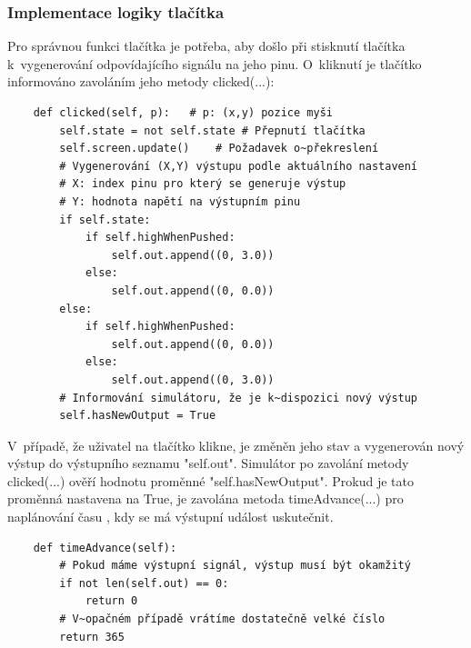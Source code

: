 \subsubsection{Implementace logiky tlačítka}

Pro správnou funkci tlačítka je potřeba, aby došlo při stisknutí tlačítka k~vygenerování odpovídajícího signálu na jeho pinu. O~kliknutí je tlačítko informováno zavoláním jeho metody clicked(...):

\begin{lstlisting}
	def clicked(self, p):	# p: (x,y) pozice myši
		self.state = not self.state	# Přepnutí tlačítka
		self.screen.update()	# Požadavek o~překreslení
		# Vygenerování (X,Y) výstupu podle aktuálního nastavení
		# X: index pinu pro který se generuje výstup
		# Y: hodnota napětí na výstupním pinu
		if self.state:
			if self.highWhenPushed:
				self.out.append((0, 3.0))
			else:
				self.out.append((0, 0.0))
		else:
			if self.highWhenPushed:
				self.out.append((0, 0.0))
			else:
				self.out.append((0, 3.0))
		# Informování simulátoru, že je k~dispozici nový výstup
		self.hasNewOutput = True
\end{lstlisting}

V~případě, že uživatel na tlačítko klikne, je změněn jeho stav a vygenerován nový výstup do výstupního seznamu "self.out". Simulátor po zavolání metody clicked(...) ověří hodnotu proměnné "self.hasNewOutput". Prokud je tato proměnná nastavena na True, je zavolána metoda timeAdvance(...) pro naplánování času , kdy se má výstupní událost uskutečnit.

\begin{lstlisting}
	def timeAdvance(self):
		# Pokud máme výstupní signál, výstup musí být okamžitý
		if not len(self.out) == 0:
			return 0
		# V~opačném případě vrátíme dostatečně velké číslo
		return 365
\end{lstlisting}

